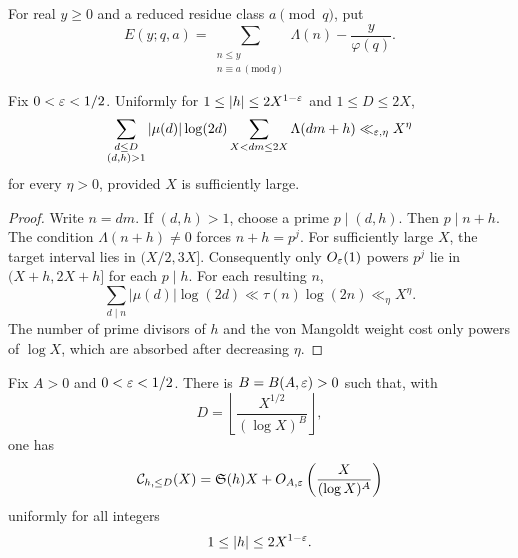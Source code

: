 For real $y\ge0$ and a reduced residue class $a\pmod q$, put
\begin{equation}\label{eq:AP-error-definition}
 E(y;q,a)=
 \sum_{\substack{n\le y\\n\equiv a\, (\mathrm{mod}\,q)}}\Lambda(n)
 -\frac y{\varphi(q)}.
\end{equation}

\begin{lemma}
\label{lem:uniform-noncoprime}
Fix $0<\varepsilon<1/2$.  Uniformly for
$1\le|h|\le2X^{1-\varepsilon}$ and $1\le D\le2X$,
\begin{equation}\label{eq:uniform-noncoprime-bound}
 \sum_{\substack{d\le D\\(d,h)>1}}
 |\mu(d)|\log(2d)
 \sum_{X<dm\le2X}\Lambda(dm+h)
 \ll_{\varepsilon,\eta}X^\eta
\end{equation}
for every $\eta>0$, provided $X$ is sufficiently large.
\end{lemma}

\begin{proof}
Write $n=dm$.  If $(d,h)>1$, choose a prime $p\mid(d,h)$.  Then
$p\mid n+h$.  The condition $\Lambda(n+h)\ne0$ forces $n+h=p^j$.
For sufficiently large $X$, the target interval lies in $(X/2,3X]$.
Consequently only $O_\varepsilon(1)$ powers $p^j$ lie in $(X+h,2X+h]$ for each
$p\mid h$.
For each resulting $n$,
\[
 \sum_{d\mid n}|\mu(d)|\log(2d)
 \ll\tau(n)\log(2n)\ll_\eta X^\eta.
\]
The number of prime divisors of $h$ and the von Mangoldt weight cost only
powers of $\log X$, which are absorbed after decreasing $\eta$.
\end{proof}

\begin{theorem}
\label{thm:uniform-small-divisor-transfer}
Fix $A>0$ and $0<\varepsilon<1/2$.  There is
$B=B(A,\varepsilon)>0$ such that, with
\begin{equation}\label{eq:theoretical-D-cutoff}
 D=\left\lfloor\frac{X^{1/2}}{(\log X)^B}\right\rfloor,
\end{equation}
one has
\begin{equation}\label{eq:uniform-short-main}
 \mathcal C_{h,\le D}(X)
 =\mathfrak S(h)X
 +O_{A,\varepsilon}\left(\frac{X}{(\log X)^A}\right)
\end{equation}
uniformly for all integers
\begin{equation}\label{eq:uniform-h-range}
 1\le|h|\le2X^{1-\varepsilon}.
\end{equation}
\end{theorem}


